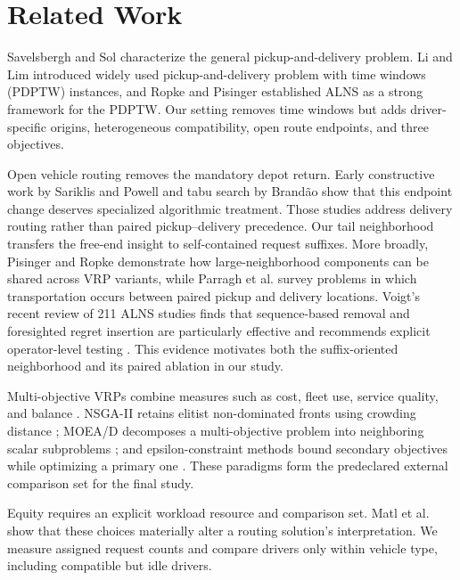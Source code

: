 \documentclass[11pt,a4paper]{article}
\begin{document}
\section{Related Work}

Savelsbergh and Sol \cite{savelsbergh1995general} characterize the general
pickup-and-delivery problem. Li and Lim \cite{li2003metaheuristic} introduced
widely used pickup-and-delivery problem with time windows (PDPTW) instances,
and Ropke and Pisinger
\cite{ropke2006alns} established ALNS as a strong framework for the PDPTW.
Our setting removes time windows but adds driver-specific origins,
heterogeneous compatibility, open route endpoints, and three objectives.

Open vehicle routing removes the mandatory depot return. Early constructive
work by Sariklis and Powell \cite{sariklis2000open} and tabu search by Brandão
\cite{brandao2004open} show that this endpoint change deserves specialized
algorithmic treatment. Those studies address delivery routing rather than
paired pickup--delivery precedence. Our tail neighborhood transfers the
free-end insight to self-contained request suffixes. More broadly, Pisinger and
Ropke \cite{pisinger2007general} demonstrate how large-neighborhood components
can be shared across VRP variants, while Parragh et al.
\cite{parragh2008survey} survey problems in which transportation occurs between
paired pickup and delivery locations.
Voigt's recent review of 211 ALNS studies finds that sequence-based removal and
foresighted regret insertion are particularly effective and recommends explicit
operator-level testing \cite{voigt2025operators}. This evidence motivates both
the suffix-oriented neighborhood and its paired ablation in our study.

Multi-objective VRPs combine measures such as cost, fleet use, service quality,
and balance \cite{jozefowiez2008multi}. NSGA-II retains elitist non-dominated
fronts using crowding distance \cite{deb2002nsga2}; MOEA/D decomposes a
multi-objective problem into neighboring scalar subproblems
\cite{zhang2007moead}; and epsilon-constraint methods bound secondary objectives
while optimizing a primary one \cite{mavrotas2009epsilon}. These paradigms form
the predeclared external comparison set for the final study.

Equity requires an explicit workload resource and comparison set. Matl et al.
\cite{matl2018equity} show that these choices materially alter a routing
solution's interpretation. We measure assigned request counts and compare
drivers only within vehicle type, including compatible but idle drivers.
\end{document}
